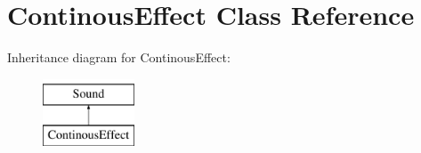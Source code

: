 \hypertarget{class_continous_effect}{}\section{Continous\+Effect Class Reference}
\label{class_continous_effect}
Inheritance diagram for Continous\+Effect\+:\begin{figure}[H]
\begin{center}
\leavevmode
\includegraphics[height=2.000000cm]{class_continous_effect}
\end{center}
\end{figure}
